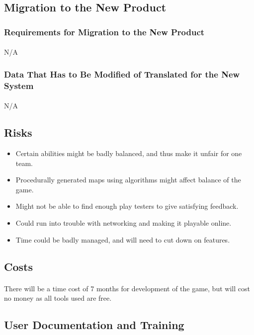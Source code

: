\documentclass[12pt, titlepage]{article}
\begin{document}
\subsection{Migration to the New Product}
\subsubsection{Requirements for Migration to the New Product}
\paragraph{}N/A
\subsubsection{Data That Has to Be Modified of Translated for the New System}
\paragraph{}N/A
\subsection{Risks}
\begin{itemize}
    \item Certain abilities might be badly balanced, and thus make it unfair for one team.
    \item Procedurally generated maps using algorithms might affect balance of the game. 
    \item Might not be able to find enough play testers to give satisfying feedback.
    \item Could run into trouble with networking and making it playable online.
    \item Time could be badly managed, and will need to cut down on features.
\end{itemize}
\subsection{Costs}
\paragraph{}There will be a time cost of 7 months for development of the game, but will cost no money as all tools used are free.
\subsection{User Documentation and Training}
\end{document}
